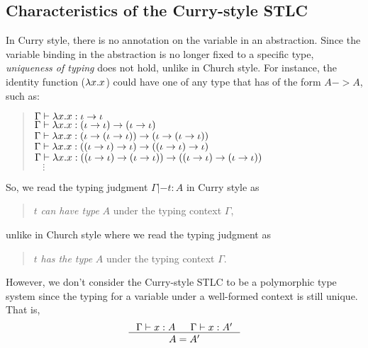 \subsection{Characteristics of the Curry-style STLC}\label{sec:stlc:curry}
In Curry style, there is no annotation on the variable in
an abstraction. Since the variable binding in the abstraction is no longer
fixed to a specific type, \emph{uniqueness of typing} does not hold,
unlike in Church style. For instance, the identity function ($\lambda x.x$)
could have one of any type that has of the form $A -> A$, such as:
\begin{quote}\vspace*{-1em}
\begin{singlespace}
$\Gamma |- \lambda x.x : \iota -> \iota$ \\
$\Gamma |- \lambda x.x : (\iota -> \iota) -> (\iota -> \iota)$ \\
$\Gamma |- \lambda x.x : (\iota -> (\iota -> \iota)) -> (\iota -> (\iota -> \iota))$ \\
$\Gamma |- \lambda x.x : ((\iota -> \iota) -> \iota) -> ((\iota -> \iota) -> \iota)$ \\
$\Gamma |- \lambda x.x : ((\iota -> \iota) -> (\iota -> \iota)) -> ((\iota -> \iota) -> (\iota -> \iota))$ \\
$~~~~ \vdots $
\end{singlespace}
\end{quote}
So, we read the typing judgment $\Gamma |- t : A$ in Curry style as
\begin{quote}
$t$ \emph{can have type} $A$ under the typing context $\Gamma$,
\end{quote}
unlike in Church style where we read the typing judgment as
\begin{quote}
$t$ \emph{has the type} $A$ under the typing context $\Gamma$.
\end{quote}
However, we don't consider the Curry-style STLC to be
a polymorphic type system since the typing for a variable
under a well-formed context is still unique. That is,
\[ \inference{\Gamma |- x : A & \Gamma |- x : A'}{A = A'} \]

